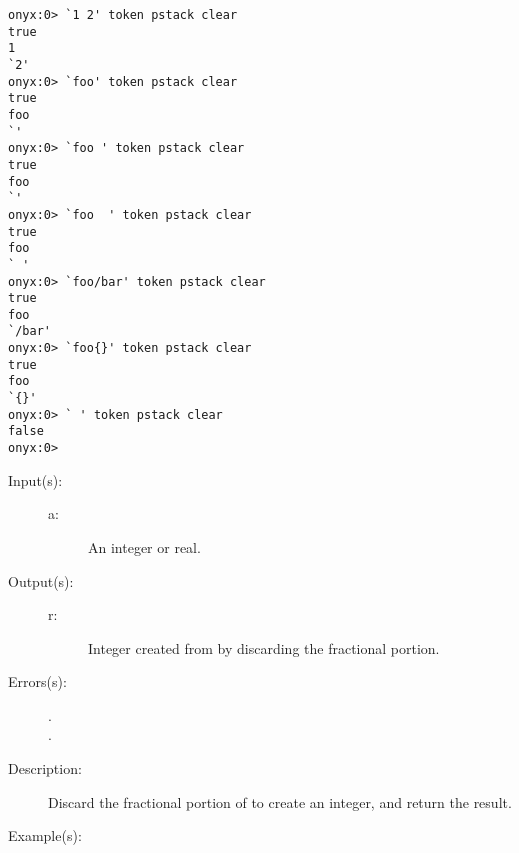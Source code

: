 \begin{description}
\begin{description}
\begin{verbatim}
onyx:0> `1 2' token pstack clear
true
1
`2'
onyx:0> `foo' token pstack clear
true
foo
`'
onyx:0> `foo ' token pstack clear
true
foo
`'
onyx:0> `foo  ' token pstack clear
true
foo
` '
onyx:0> `foo/bar' token pstack clear
true
foo
`/bar'
onyx:0> `foo{}' token pstack clear
true
foo
`{}'
onyx:0> ` ' token pstack clear
false
onyx:0>
		\end{verbatim}
	\end{description}
\label{systemdict:trunc}
\item[{\onyxop{a}{trunc}{r}}: ]
	\begin{description}\item[]
	\item[Input(s): ]
		\begin{description}\item[]
		\item[a: ]
			An integer or real.
		\end{description}
	\item[Output(s): ]
		\begin{description}\item[]
		\item[r: ]
			Integer created from  by discarding the
			fractional portion.
		\end{description}
	\item[Errors(s): ]
		\begin{description}\item[]
		\item[.]
		\item[.]
		\end{description}
	\item[Description: ]
		Discard the fractional portion of  to create an
		integer, and return the result.
	\item[Example(s): ]\begin{verbatim}


\end{verbatim}
\end{description}
\end{description}
